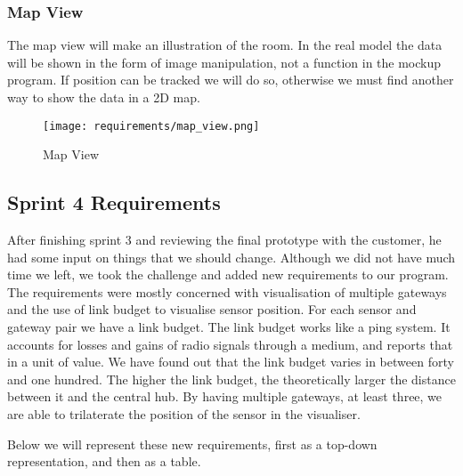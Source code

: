\documentclass[../document]{subfiles}
\begin{document}
\newpage

\subsubsection{Map View}
The map view will make an illustration of the room. In the real model the data will be shown in the form of image manipulation, not a function in the mockup program. If position can be tracked we will do so, otherwise we must find another way to show the data in a 2D map.

\begin{figure}[H]
\centering
\texttt{[image: requirements/map\_view.png]}
\caption{Map View}
\end{figure}

\subsection{Sprint 4 Requirements}
\label{requirements_sprint_4}
After finishing sprint 3 and reviewing the final prototype with the customer, he had some input on things that we should change. Although we did not have much time we left, we took the challenge and added new requirements to our program. The requirements were mostly concerned with visualisation of multiple gateways and the use of link budget to visualise sensor position. For each sensor and gateway pair we have a link budget. The link budget works like a ping system. It accounts for losses and gains of radio signals through a medium, and reports that in a unit of value. We have found out that the link budget varies in between forty and one hundred. The higher the link budget, the theoretically larger the distance between it and the central hub. By having multiple gateways, at least three, we are able to trilaterate the position of the sensor in the visualiser.

Below we will represent these new requirements, first as a top-down representation, and then as a table.
\end{document}
